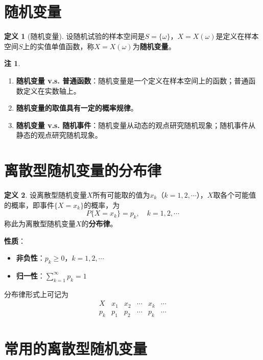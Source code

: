\documentclass[11pt,a4paper]{report}
\theoremstyle{definition}
\newtheorem{definition}{定义}[chapter]
\newtheorem{remark}{注}[chapter]
\theoremstyle{plain}
\begin{document}
\section{随机变量}

\begin{definition}[随机变量]
设随机试验的样本空间是\(S=\{\omega\}\)，\(X=X(\omega)\)是定义在样本空间\(S\)上的实值单值函数，称\(X=X(\omega)\)为\textbf{随机变量}。
\end{definition}

\begin{remark}
\begin{enumerate}[label=\arabic*.,leftmargin=2em]
    \item \textbf{随机变量 v.s. 普通函数}：随机变量是一个定义在样本空间上的函数；普通函数定义在实数轴上。
    \item \textbf{随机变量的取值具有一定的概率规律}。
    \item \textbf{随机变量 v.s. 随机事件}：随机变量从动态的观点研究随机现象；随机事件从静态的观点研究随机现象。
\end{enumerate}
\end{remark}

\section{离散型随机变量的分布律}

\begin{definition}
设离散型随机变量\(X\)所有可能取的值为\(x_k\)（\(k=1,2,\cdots\)），\(X\)取各个可能值的概率，即事件\(\{X=x_k\}\)的概率，为
\[
P\{X=x_k\}=p_k,\quad k=1,2,\cdots
\]
称此为离散型随机变量\(X\)的\textbf{分布律}。
\end{definition}

\textbf{性质}：
\begin{itemize}[leftmargin=2em]
    \item \textbf{非负性}：\(p_k\geq 0\)，\(k=1,2,\cdots\)
    \item \textbf{归一性}：\(\sum_{k=1}^{\infty}p_k=1\)
\end{itemize}

分布律形式上可记为
\[
\begin{array}{c|ccccc}
X & x_1 & x_2 & \cdots & x_k & \cdots \\ \hline
p_k & p_1 & p_2 & \cdots & p_k & \cdots
\end{array}
\]

\section{常用的离散型随机变量}
\end{document}
